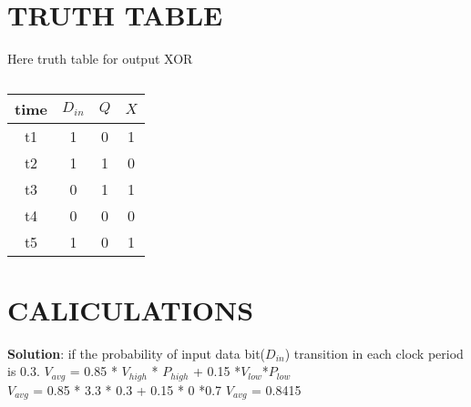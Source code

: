 \documentclass[a4paper,11pt,twocolumn]{article}
\begin{document}
\section{TRUTH TABLE}
Here truth table for output XOR
\begin{table}[!ht]
	\centering
	\begin{tabular}{ |c |c |c |c | }
		\hline
		\newline
		\textbf{time} & \textbf{$ D_{in} $} & \textbf{$ Q $} & \textbf{$ X $}\\
		\hline
		t1 & 1 & 0 & 1 \\
                t2 & 1 & 1 & 0 \\
		t3 & 0 & 1 & 1 \\
		t4 & 0 & 0 & 0 \\
		t5 & 1 & 0 & 1 \\
		
		\hline
        \end{tabular}
  \caption{}
\end{table}
\bigskip
\section{CALICULATIONS}
\textbf{Solution}: if the probability of input data bit($D_{in}$) transition in each clock period is 0.3.
$ V_{avg}$ = 0.85 * $ V_{high} $ * $ P_{high} $ + 0.15 *$V_{low}$*$P_{low} $\\
$ V_{avg}$ = 0.85 * 3.3 * 0.3 + 0.15 * 0 *0.7
$ V_{avg}$ = 0.8415
\end{document}
